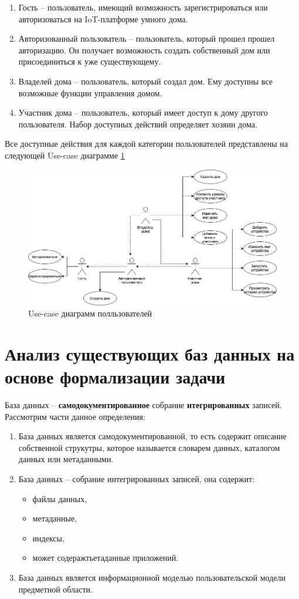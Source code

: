 \begin{enumerate}
    \item Гость -- пользователь, имеющий возможность 
    зарегистрироваться или авторизоваться на IoT-платформе умного дома.
    \item Авторизованный пользователь -- пользователь, который прошел прошел авторизацию. 
    Он получает возможность создать собственный дом или присоединиться к уже существующему.
    \item Владелей дома -- пользователь, который создал дом. Ему доступны все возможные функции управления домом.
    \item Участник дома -- пользователь, который имеет доступ к дому другого пользователя. 
    Набор доступных действий определяет хозяин дома.
\end{enumerate}

Все доступные действия для каждой категории пользователей представлены на следующей Use-case диаграмме \ref{img:iot}
\begin{figure}[h]
    \includegraphics[width=0.9\linewidth]{img/ucd.png}
    \caption{Use-case диаграмм полльзователей}
    \label{img:iot}
\end{figure}
\clearpage

\section{Анализ существующих баз данных на основе формализации задачи}
База данных -- \textbf{самодокументированное} собрание \textbf{нтегрированных} записей. Рассмотрим части данное определения:
\begin{enumerate}
    \item База данных является самодокументированной, то есть содержит описание собственной струкутры, которое называется 
    словарем данных, каталогом данных или метаданными.
    \item База данных -- собрание интегрированных записей, она содержит:
    \begin{itemize}
        \item файлы данных,
        \item метаданные,
        \item индексы,
        \item может содеражтьетаданные приложений.
    \end{itemize}
    \item База данных является информационной моделью пользовательской модели предметной области.
\end{enumerate}

